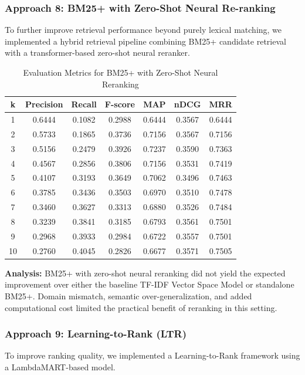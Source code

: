 \subsubsection{Approach 8: BM25+ with Zero-Shot Neural Re-ranking}
To further improve retrieval performance beyond purely lexical matching, we implemented a hybrid retrieval pipeline combining BM25+ candidate retrieval with a transformer-based zero-shot neural reranker.

\begin{table}[H]
\centering
\begin{tabular}{|c|c|c|c|c|c|c|}
\hline
k & Precision & Recall & F-score & MAP & nDCG & MRR \\
\hline
1 & 0.6444 & 0.1082 & 0.2988 & 0.6444 & 0.3567 & 0.6444 \\
2 & 0.5733 & 0.1865 & 0.3736 & 0.7156 & 0.3567 & 0.7156 \\
3 & 0.5156 & 0.2479 & 0.3926 & 0.7237 & 0.3590 & 0.7363 \\
4 & 0.4567 & 0.2856 & 0.3806 & 0.7156 & 0.3531 & 0.7419 \\
5 & 0.4107 & 0.3193 & 0.3649 & 0.7062 & 0.3496 & 0.7463 \\
6 & 0.3785 & 0.3436 & 0.3503 & 0.6970 & 0.3510 & 0.7478 \\
7 & 0.3460 & 0.3627 & 0.3313 & 0.6880 & 0.3526 & 0.7484 \\
8 & 0.3239 & 0.3841 & 0.3185 & 0.6793 & 0.3561 & 0.7501 \\
9 & 0.2968 & 0.3933 & 0.2984 & 0.6722 & 0.3557 & 0.7501 \\
10 & 0.2760 & 0.4045 & 0.2826 & 0.6677 & 0.3571 & 0.7505 \\
\hline
\end{tabular}
\caption{Evaluation Metrics for BM25+ with Zero-Shot Neural Reranking}
\end{table}

\textbf{Analysis:}
BM25+ with zero-shot neural reranking did not yield the expected improvement over either the baseline TF-IDF Vector Space Model or standalone BM25+. Domain mismatch, semantic over-generalization, and added computational cost limited the practical benefit of reranking in this setting.

\subsubsection{Approach 9: Learning-to-Rank (LTR)}
To improve ranking quality, we implemented a Learning-to-Rank framework using a LambdaMART-based model.

